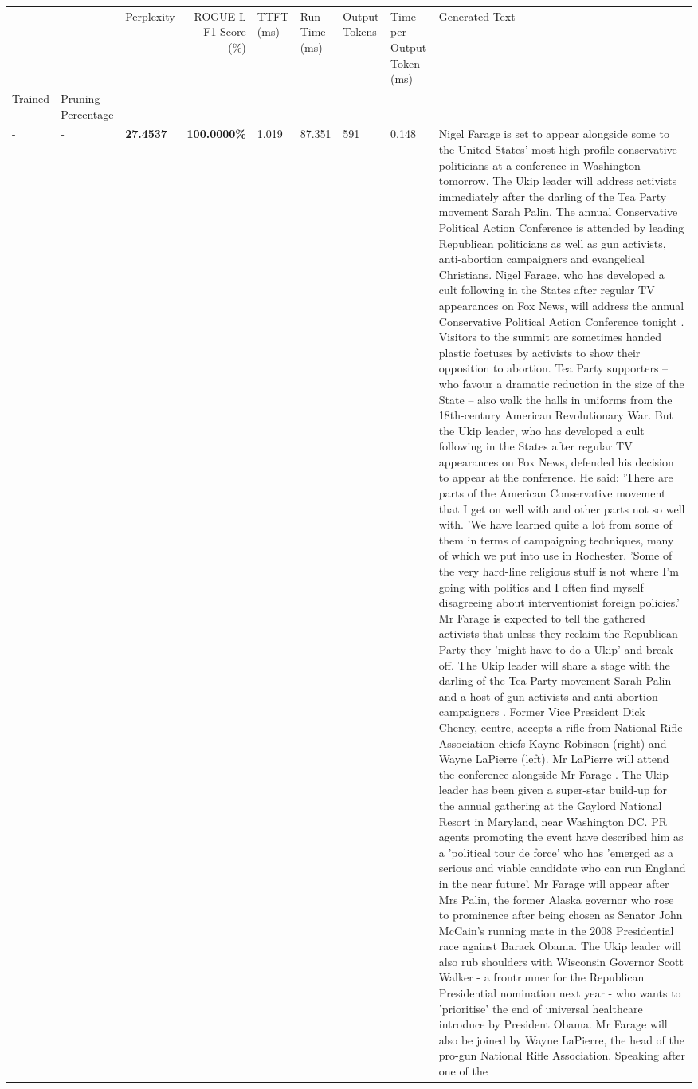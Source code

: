 \begin{table}[H]
\label{tab:evaluation-pipeline-4}
\begin{tabular}{lllrlllll}
\toprule
 &  & Perplexity & ROGUE-L F1 Score (\%) & TTFT (ms) & Run Time (ms) & Output Tokens & Time per Output Token (ms) & Generated Text \\
Trained & Pruning Percentage &  &  &  &  &  &  &  \\
\midrule
- & - & \bfseries 27.4537 & \bfseries 100.0000\% & 1.019 & 87.351 & 591 & 0.148 & Nigel Farage is set to appear alongside some to the United States' most high-profile conservative politicians at a conference in Washington tomorrow. The Ukip leader will address activists immediately after the darling of the Tea Party movement Sarah Palin. The annual Conservative Political Action Conference is attended by leading Republican politicians as well as gun activists, anti-abortion campaigners and evangelical Christians. Nigel Farage, who has developed a cult following in the States after regular TV appearances on Fox News, will address the annual Conservative Political Action Conference tonight . Visitors to the summit are sometimes handed plastic foetuses by activists to show their opposition to abortion. Tea Party supporters – who favour a dramatic reduction in the size of the State – also walk the halls in uniforms from the 18th-century American Revolutionary War. But the Ukip leader, who has developed a cult following in the States after regular TV appearances on Fox News, defended his decision to appear at the conference. He said: 'There are parts of the American Conservative movement that I get on well with and other parts not so well with. 'We have learned quite a lot from some of them in terms of campaigning techniques, many of which we put into use in Rochester. 'Some of the very hard-line religious stuff is not where I'm going with politics and I often find myself disagreeing about interventionist foreign policies.' Mr Farage is expected to tell the gathered activists that unless they reclaim the Republican Party they 'might have to do a Ukip' and break off. The Ukip leader will share a stage with the darling of the Tea Party movement Sarah Palin and a host of gun activists and anti-abortion campaigners . Former Vice President Dick Cheney, centre, accepts a rifle from National Rifle Association chiefs Kayne Robinson (right) and Wayne LaPierre (left). Mr LaPierre will attend the conference alongside Mr Farage . The Ukip leader has been given a super-star build-up for the annual gathering at the Gaylord National Resort in Maryland, near Washington DC. PR agents promoting the event have described him as a 'political tour de force' who has 'emerged as a serious and viable candidate who can run England in the near future'. Mr Farage will appear after Mrs Palin, the former Alaska governor who rose to prominence after being chosen as Senator John McCain's running mate in the 2008 Presidential race against Barack Obama. The Ukip leader will also rub shoulders with Wisconsin Governor Scott Walker - a frontrunner for the Republican Presidential nomination next year - who wants to 'prioritise' the end of universal healthcare introduce by President Obama. Mr Farage will also be joined by Wayne LaPierre, the head of the pro-gun National Rifle Association. Speaking after one of the 
\end{tabular}
\end{table}
